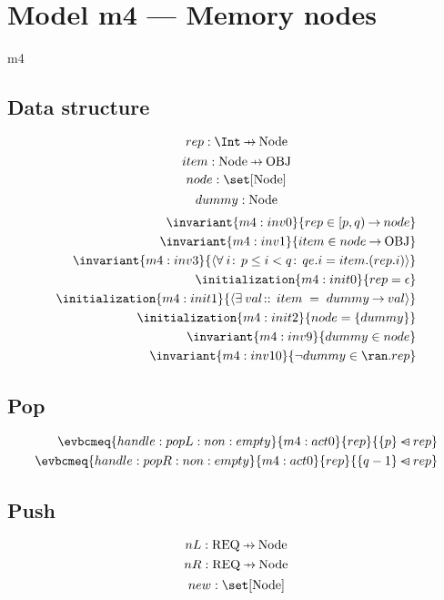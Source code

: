 \documentclass[12pt]{amsart}
\newcommand{\REQ}{\text{REQ}}
\begin{document}
\section{Model m4 --- Memory nodes}
\newcommand{\Node}{\text{Node}}
\begin{machine}{m4}
\subsection{Data structure}
  \newset{\Node}
  \[ \variable{ rep : \Int \pfun \Node } \]
  \[ \variable{ item : \Node \pfun \OBJ } \]
  \[ \variable{ node : \set [\Node] } \]
  \[ \constant{ dummy : \Node } \]
  \begin{align}
    \invariant{m4:inv0}
      { rep \in \intervalR{p}{q} \tfun node } \\
    \invariant{m4:inv1}
      { item \in node \tfun \OBJ } \\
    \invariant{m4:inv3}
      { \qforall{i}{\betweenR{p}{i}{q}}{ qe.i = item.(rep.i) } } \\
    \initialization{m4:init0}{ rep  = \emptyfun } \\
    \initialization{m4:init1}
      { \qexists{val}{}{ item \1= dummy \fun val } } \\
    \initialization{m4:init2}{ node = \{ dummy \} } \\
    \invariant{m4:inv9}
      { dummy \in node } \\
    \invariant{m4:inv10}
      { \neg dummy \in \ran.rep }
  \end{align}
\subsection{Pop}
  \begin{align}
    \evbcmeq{handle:popL:non:empty}{m4:act0}{rep}
      { \{ p \} \domsub rep } \\
    \evbcmeq{handle:popR:non:empty}{m4:act0}{rep}
      { \{ q-1 \} \domsub rep }
  \end{align}
\subsection{Push}
  \[ \variable{ nL : \REQ \pfun \Node } \]
  \[ \variable{ nR : \REQ \pfun \Node } \]
  \[ \variable{ new : \set [\Node] } \]

\end{machine}
\end{document}

